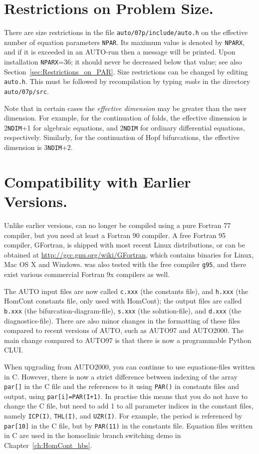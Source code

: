 \documentclass[12pt]{report}
\begin{document}
\section{ Restrictions on Problem Size.} \label{sec:Restrictions}
There are size restrictions in the file {\tt auto/07p/include/auto.h}
on the effective number of equation parameters {\tt NPAR}.
Its maximum value is denoted by {\tt NPARX}, and if
it is exceeded in an {\cal AUTO}-run then a message will be printed.
Upon installation {\tt NPARX}=36; it should never be decreased below that value;
see also Section~\ref{sec:Restrictions_on_PAR}.
Size restrictions can be changed by editing {\tt auto.h}.
This must be followed by recompilation by typing {\it make} 
in the directory {\tt auto/07p/src}.

Note that in certain cases the {\it effective dimension} may be greater
than the user dimension.
For example, for the continuation of folds,
the effective dimension is 2{\tt NDIM}+1 for algebraic equations,
and 2{\tt NDIM} for ordinary differential equations, respectively.
Similarly, for the continuation of Hopf bifurcations,
the effective dimension is 3{\tt NDIM}+2.
 
 
\section{Compatibility with Earlier Versions.} \label{sec:Compatibility}
Unlike earlier versions, \AUTO can no longer be compiled using a pure
Fortran 77 compiler, but you need at least a Fortran 90 compiler.
A free Fortran 95 compiler, GFortran, is shipped with most recent
Linux distributions, or can be obtained at
\url{http://gcc.gnu.org/wiki/GFortran}, which contains binaries for
Linux, Mac OS X and Windows. \AUTO was also tested with the free
compiler {\tt g95}, and there exist various commercial Fortran
9x compilers as well.

The {\cal AUTO} input files are now called 
{\tt c.xxx} (the constants file),
and
{\tt h.xxx} (the {\cal HomCont} constants file, only used with {\cal HomCont});
the output files are called
{\tt b.xxx} (the bifurcation-diagram-file),
{\tt s.xxx} (the solution-file),
and
{\tt d.xxx} (the diagnostics-file).
There are also minor changes in the formatting of these files 
compared to recent versions of {\cal AUTO}, such as {\cal AUTO97} 
and {\cal AUTO2000}.
The main change compared to {\cal AUTO97} is that there is now a
programmable Python CLUI.

When upgrading from {\cal AUTO2000}, you can continue to use
equations-files written in C. However, there is now a strict
difference between indexing of the array {\tt par[]} in the
C file and the references to it using {\tt PAR()} in constants
files and output, using {\tt par[i]=PAR(I+1)}. In practise this
means that you do not have to change the C file, but need to
add 1 to all parameter indices in the constant files, namely
{\tt ICP(I)}, {\tt THL(I)}, and {\tt UZR(I)}. For example,
the period is referenced by {\tt par[10]} in the C file,
but by {\tt PAR(11)} in the constants file. Equation files
written in C are used in the homoclinic branch switching
demo in Chapter~\ref{ch:HomCont_hbs}.
 
\end{document}
